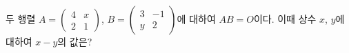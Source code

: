 두 행렬 $A=\begin{pmatrix} 4 & x \\ 2 & 1 \end{pmatrix}$, $B=\begin{pmatrix} 3 & -1 \\ y & 2 \end{pmatrix}$에 대하여 $AB=O$이다. 이때 상수 $x$, $y$에 대하여 $x-y$의 값은?
